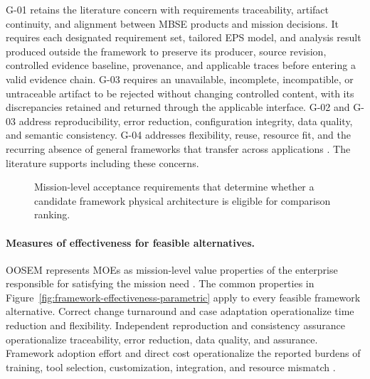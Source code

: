\documentclass[11pt,a4paper]{article}
\begin{document}
G-01 retains the literature concern with requirements traceability, artifact continuity, and alignment between MBSE products and mission decisions. It requires each designated requirement set, tailored EPS model, and analysis result produced outside the framework to preserve its producer, source revision, controlled evidence baseline, provenance, and applicable traces before entering a valid evidence chain. G-03 requires an unavailable, incomplete, incompatible, or untraceable artifact to be rejected without changing controlled content, with its discrepancies retained and returned through the applicable interface. G-02 and G-03 address reproducibility, error reduction, configuration integrity, data quality, and semantic consistency. G-04 addresses flexibility, reuse, resource fit, and the recurring absence of general frameworks that transfer across applications \citep[Sec.~5.1 and Table~5]{buruso2026modelbased} \citep[Sec.~4.7 and Table~3]{vizitiu2025optimizing} \citep[Secs.~8.4--8.6 and Table~13]{rostamnia2026digitaltwin}. The literature supports including these concerns.

\begin{figure}[htbp]
    \centering
    \resizebox{\linewidth}{!}{}
    \caption{Mission-level acceptance requirements that determine whether a candidate framework physical architecture is eligible for comparison ranking.}
    \label{fig:framework-acceptance-requirements}
\end{figure}

\paragraph{Measures of effectiveness for feasible alternatives.}
OOSEM represents MOEs as mission-level value properties of the enterprise responsible for satisfying the mission need \citep[Sec.~17.3.2]{friedenthal2014practical}. The common properties in Figure~\ref{fig:framework-effectiveness-parametric} apply to every feasible framework alternative. Correct change turnaround and case adaptation operationalize time reduction and flexibility. Independent reproduction and consistency assurance operationalize traceability, error reduction, data quality, and assurance. Framework adoption effort and direct cost operationalize the reported burdens of training, tool selection, customization, integration, and resource mismatch \citep[Sec.~4.7 and Table~3]{vizitiu2025optimizing} \citep[Sec.~5.1 and Table~5]{buruso2026modelbased} \citep[Sec.~6.2]{rojasramirez2022comparative} \citep[Secs.~8.4--8.6]{rostamnia2026digitaltwin}.
\end{document}
